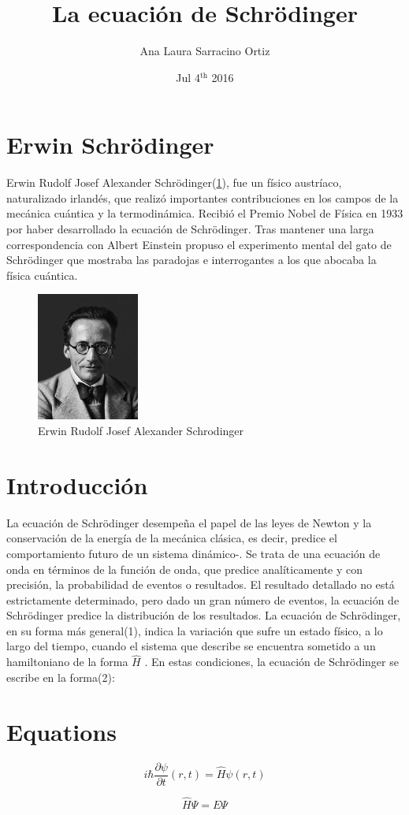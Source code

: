\documentclass[twocolumn]{article}
\author{Ana Laura Sarracino Ortiz}
\date{Jul 4$^{\text{th}}$ 2016}
\title{\sc La ecuaci\'on de Schr\"odinger}
\begin{document}
\maketitle{}

\section{Erwin Schr\"odinger}
Erwin Rudolf Josef Alexander Schr\"odinger(\ref{fig:erwin}), fue un f\'isico austr\'iaco, naturalizado irland\'es, que realiz\'o importantes contribuciones en los campos de la mec\'anica cu\'antica y la termodin\'amica. Recibi\'o el Premio Nobel de F\'isica en 1933 por haber desarrollado la ecuaci\'on de Schr\"odinger. Tras mantener una larga correspondencia con Albert Einstein propuso el experimento mental del gato de Schr\"odinger que mostraba las paradojas e interrogantes a los que abocaba la f\'isica cu\'antica.

\begin{figure}[h!b]
	\centering
	\includegraphics[width=0.3\textwidth]{Erwin}
	\caption{Erwin Rudolf Josef Alexander Schrodinger}
	\label{fig:erwin}
\end{figure}


\section{Introducci\'on}
La ecuaci\'on de Schr\"odinger desempe\~na el papel de las leyes de Newton y la
conservaci\'on de la energ\'ia de la mec\'anica cl\'asica, es decir, predice
el comportamiento futuro de un sistema din\'amico-. Se trata de una ecuaci\'on
de onda en t\'erminos de la funci\'on de onda, que predice anal\'iticamente y
con precisi\'on, la probabilidad de eventos o resultados. El resultado
detallado no est\'a estrictamente determinado, pero dado un gran n\'umero de
eventos, la ecuaci\'on de Schr\"odinger predice la distribuci\'on de los
resultados. La ecuaci\'on de Schr\"odinger, en su forma m\'as general(1), indica la variaci\'on que sufre un
estado f\'isico, a lo largo del tiempo, cuando el sistema que describe se encuentra
sometido a un hamiltoniano de la forma $\hat{H}$ . En estas condiciones, la ecuaci\'on de Schr\"odinger se
escribe en la forma(2):

\section{Equations}

    \begin{equation}
	i\hbar\frac{\partial{\psi}}{\partial{t}}(r,t)=\hat{H}{\psi}(r,t)
    \end{equation}	

    \begin{equation}
	\hat{H} \Psi= E \Psi
    \end{equation}
\end{document}
